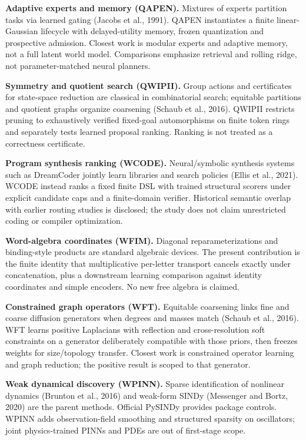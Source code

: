\documentclass[
  11pt,
  a4paper,
]{article}
\begin{document}
\textbf{Adaptive experts and memory (QAPEN).} Mixtures of experts
partition tasks via learned gating (Jacobs et al., 1991). QAPEN
instantiates a finite linear-Gaussian lifecycle with delayed-utility
memory, frozen quantization and prospective admission. Closest work is
modular experts and adaptive memory, not a full latent world model.
Comparisons emphasize retrieval and rolling ridge, not parameter-matched
neural planners.

\textbf{Symmetry and quotient search (QWIPII).} Group actions and
certificates for state-space reduction are classical in combinatorial
search; equitable partitions and quotient graphs organize coarsening
(Schaub et al., 2016). QWIPII restricts pruning to exhaustively verified
fixed-goal automorphisms on finite token rings and separately tests
learned proposal ranking. Ranking is not treated as a correctness
certificate.

\textbf{Program synthesis ranking (WCODE).} Neural/symbolic synthesis
systems such as DreamCoder jointly learn libraries and search policies
(Ellis et al., 2021). WCODE instead ranks a fixed finite DSL with
trained structural scorers under explicit candidate caps and a
finite-domain verifier. Historical semantic overlap with earlier routing
studies is disclosed; the study does not claim unrestricted coding or
compiler optimization.

\textbf{Word-algebra coordinates (WFIM).} Diagonal reparameterizations
and binding-style products are standard algebraic devices. The present
contribution is the finite identity that multiplicative per-letter
transport cancels exactly under concatenation, plus a downstream
learning comparison against identity coordinates and simple encoders. No
new free algebra is claimed.

\textbf{Constrained graph operators (WFT).} Equitable coarsening links
fine and coarse diffusion generators when degrees and masses match
(Schaub et al., 2016). WFT learns positive Laplacians with reflection
and cross-resolution soft constraints on a generator deliberately
compatible with those priors, then freezes weights for size/topology
transfer. Closest work is constrained operator learning and graph
reduction; the positive result is scoped to that generator.

\textbf{Weak dynamical discovery (WPINN).} Sparse identification of
nonlinear dynamics (Brunton et al., 2016) and weak-form SINDy (Messenger
and Bortz, 2020) are the parent methods. Official PySINDy provides
package controls. WPINN adds observation-field smoothing and structured
sparsity on oscillators; joint physics-trained PINNs and PDEs are out of
first-stage scope.
\end{document}
